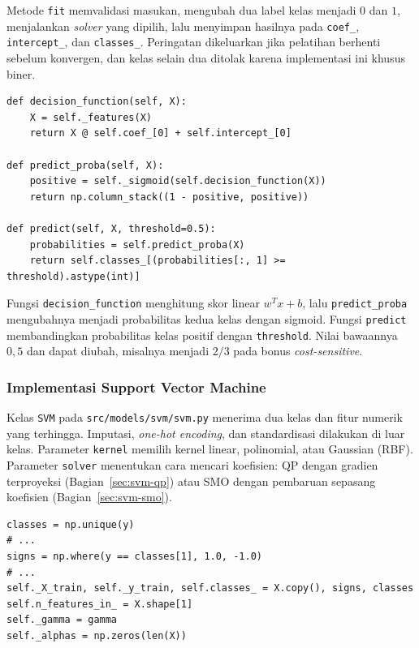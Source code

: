 Metode \texttt{fit} memvalidasi masukan, mengubah dua label kelas menjadi
$0$ dan $1$, menjalankan \textit{solver} yang dipilih, lalu menyimpan hasilnya pada
\texttt{coef\_}, \texttt{intercept\_}, dan \texttt{classes\_}. Peringatan
dikeluarkan jika pelatihan berhenti sebelum konvergen, dan kelas selain dua
ditolak karena implementasi ini khusus biner.

\begin{lstlisting}
def decision_function(self, X):
    X = self._features(X)
    return X @ self.coef_[0] + self.intercept_[0]

def predict_proba(self, X):
    positive = self._sigmoid(self.decision_function(X))
    return np.column_stack((1 - positive, positive))

def predict(self, X, threshold=0.5):
    probabilities = self.predict_proba(X)
    return self.classes_[(probabilities[:, 1] >= threshold).astype(int)]
\end{lstlisting}

Fungsi \texttt{decision\_function} menghitung skor linear $w^{T}x+b$, lalu
\texttt{predict\_proba} mengubahnya menjadi probabilitas kedua kelas dengan
sigmoid. Fungsi \texttt{predict} membandingkan probabilitas kelas positif dengan
\texttt{threshold}. Nilai bawaannya $0{,}5$ dan dapat diubah, misalnya menjadi
$2/3$ pada bonus \textit{cost-sensitive}.

\subsubsection{Implementasi Support Vector Machine}

Kelas \texttt{SVM} pada \texttt{src/models/svm/svm.py} menerima dua kelas
dan fitur numerik yang terhingga. Imputasi, \textit{one-hot encoding}, dan
standardisasi dilakukan di luar kelas. Parameter \texttt{kernel} memilih
kernel linear, polinomial, atau Gaussian (RBF). Parameter \texttt{solver}
menentukan cara mencari koefisien: QP dengan gradien terproyeksi
(Bagian~\ref{sec:svm-qp}) atau SMO dengan pembaruan sepasang koefisien
(Bagian~\ref{sec:svm-smo}).

\begin{lstlisting}[caption={Persiapan data pada metode fit}, label={lst:svm-fit}]
classes = np.unique(y)
# ...
signs = np.where(y == classes[1], 1.0, -1.0)
# ...
self._X_train, self._y_train, self.classes_ = X.copy(), signs, classes
self.n_features_in_ = X.shape[1]
self._gamma = gamma
self._alphas = np.zeros(len(X))
\end{lstlisting}

